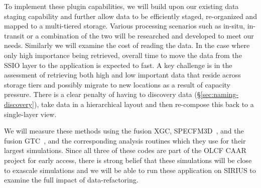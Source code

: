To implement these plugin capabilities, we will build upon our existing data staging 
capability and further allow data to be
efficiently staged, re-organized and mapped to a multi-tiered storage. Various
processing scenarios such as in-situ, in-transit or a combination of the two
will be researched and developed to meet our needs.
Similarly we will examine the cost of reading the data. In the case where only high importance being retrieved,
overall time to move the data from the SSIO layer to the
application is expected to fast. A key challenge is in the assessment of retrieving
both high and low important data that reside across storage tiers and possibly migrate to
new locations as a result of capacity pressure. There is a
clear penalty of having to discovery data (\S\ref{sec:naming-discovery}), take data in a hierarchical layout and then re-compose
this back to a single-layer view.  

We will measure these methods using the fusion XGC, SPECFM3D~\cite{SPECFEM3D}, and the
fusion GTC~\cite{klasky2003grid}, and the
corresponding analysis routines which they use for their largest simulations.
Since all three of these codes are part of the
OLCF CAAR~\cite{CAAR} project for early access, there is strong belief that these
simulations will be close to exascale simulations and we will be able to run
these application on SIRIUS to examine the full impact of data-refactoring.

